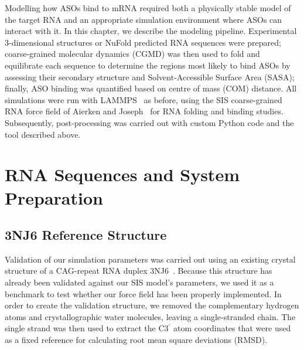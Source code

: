 
Modelling how ASOs bind to mRNA required both a physically stable model of the target RNA and an appropriate simulation environment where ASOs can interact with it. In this chapter, we describe the modeling pipeline. Experimental 3-dimensional structures or NuFold predicted RNA sequences were prepared; coarse-grained molecular dynamics (CGMD) was then used to fold and equilibrate each sequence to determine the regions most likely to bind ASOs by assessing their secondary structure and Solvent-Accessible Surface Area (SASA); finally, ASO binding was quantified based on centre of mass (COM) distance. All simulations were run with LAMMPS~\cite{Thompson2022} as before, using the SIS coarse-grained RNA force field of Aierken and Joseph~\cite{Aierken2024} for RNA folding and binding studies. Subsequently, post-processing was carried out with custom Python code and the tool described above.
\section{RNA Sequences and System Preparation}
\label{sec:system_prep}

\subsection{3NJ6 Reference Structure}
\label{sec:3nj6}

Validation of our simulation parameters was carried out using an existing crystal structure of a CAG-repeat RNA duplex 3NJ6~\cite{Aierken2024}. Because this structure has already been validated against our SIS model’s parameters, we used it as a benchmark to test whether our force field has been properly implemented. In order to create the validation structure, we removed the complementary hydrogen atoms and crystallographic water molecules, leaving a single-stranded chain. The single strand was then used to extract the  C3$^\prime$ atom coordinates that were used as a fixed reference for calculating root mean square deviations (RMSD).

